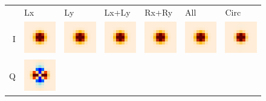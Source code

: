 \documentclass{article}
\begin{document}
\begin{figure}
	\centering
	\hspace*{-5mm}\begin{tabular}{rm{11mm}m{11mm}m{11mm}m{11mm}m{11mm}m{11mm}}
		&
		\hspace*{5mm}Lx &
		\hspace*{5mm}Ly &
		\hspace*{2mm}Lx+Ly &
		\hspace*{2mm}Rx+Ry &
		\hspace*{5mm}All &
		\hspace*{3mm}Circ \\
		I &
		\includegraphics[height=14mm]{plots/ellip_mismatch_srcs_sb_det0_crop_0.png} &
		\includegraphics[height=14mm]{plots/ellip_mismatch_srcs_sb_det1_crop_0.png} &
		\includegraphics[height=14mm]{plots/ellip_mismatch_srcs_sb_det01_crop_0.png} &
		\includegraphics[height=14mm]{plots/ellip_mismatch_srcs_sb_det23_crop_0.png} &
		\includegraphics[height=14mm]{plots/ellip_mismatch_srcs_sb_tot_crop_0.png} &
		\includegraphics[height=14mm]{plots/circular_srcs_sb_tot_crop_0.png} \\
		Q &
		\includegraphics[height=14mm]{plots/ellip_mismatch_srcs_sb_det0_crop_1.png} &

\end{tabular}
\end{figure}
\end{document}
